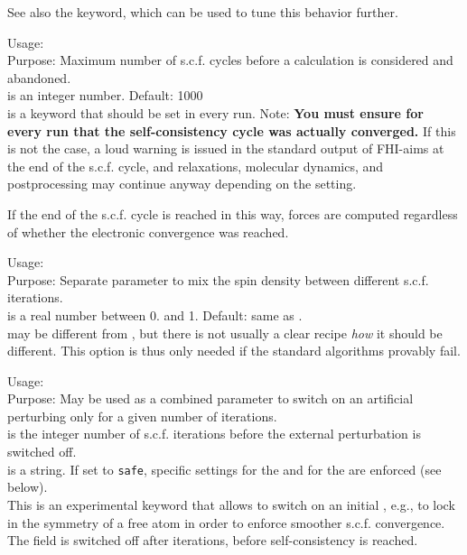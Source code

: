 See also the  keyword, which can be used to tune
this behavior further.

{
  \noindent
  Usage:   \\[1.0ex]
  Purpose: Maximum number of s.c.f. cycles before a calculation is
    considered and abandoned. \\[1.0ex]
   is an integer number. Default: 1000 \\
}
 is a keyword that should be set in every
run. Note: \textbf{You must ensure for every run that the
self-consistency cycle was actually converged.} If this is not the
case, a loud warning is issued in the standard output of FHI-aims at
the end of the s.c.f. cycle, and relaxations, molecular dynamics,
and postprocessing may continue anyway depending on the
 setting.

If the end of the s.c.f. cycle is reached in this way, forces are
computed regardless of whether the electronic convergence was reached.

{
  \noindent
  Usage:   \\[1.0ex]
  Purpose: Separate parameter to mix the spin density between
    different s.c.f. iterations. \\[1.0ex]
   is a real number between 0. and 1. Default: same as
  . \\
}
 may be different from
, but there is not usually a clear recipe
\emph{how} it should be different. This option is thus only needed if
the standard algorithms provably fail.

{
  \noindent
  Usage:    \\[1.0ex]
  Purpose: May be used as a combined parameter to switch on
    an artificial perturbing  only for a given
    number of iterations. \\[1.0ex]
   is the integer number of s.c.f. iterations before
    the external perturbation is switched off. \\
   is a string. If set to \texttt{safe}, specific
    settings for the  and for the
     are enforced (see below). \\
}
This is an experimental keyword that allows to switch on an initial
, e.g., to lock in the symmetry of a free
atom in order to enforce smoother s.c.f. convergence. The field is
switched off after  iterations, before self-consistency
is reached.

